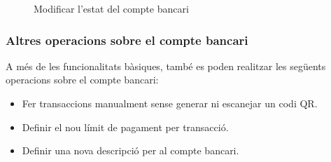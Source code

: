 \documentclass[a4paper,12pt,twoside]{ThesisStyle}
\begin{document}
\begin{figure}[h]
    \caption{Modificar l'estat del compte bancari}
    \label{fig: Modificar l'estat del compte bancari}
\end{figure}


\clearpage

\subsubsection{Altres operacions sobre el compte bancari}
\label{subsubsec:Altres operacions sobre el compte bancari}


A més de les funcionalitats bàsiques, també es poden realitzar les següents operacions sobre el compte bancari:

\begin{itemize} 
    \item Fer transaccions manualment sense generar ni escanejar un codi QR. 
    \item Definir el nou límit de pagament per transacció. 
    \item Definir una nova descripció per al compte bancari.
\end{itemize}
\end{document}

